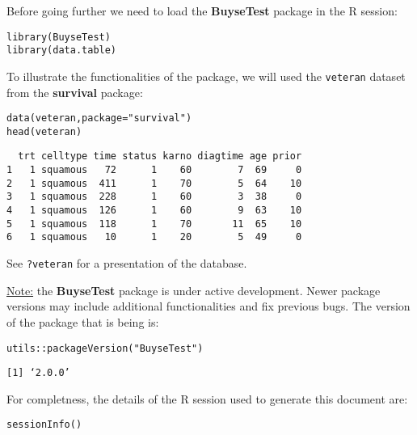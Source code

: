 \documentclass[12pt]{article}
\begin{document}
\clearpage

Before going further we need to load the \textbf{BuyseTest} package in the R
session:
\lstset{language=r,label= ,caption= ,captionpos=b,numbers=none}
\begin{lstlisting}
library(BuyseTest)
library(data.table)
\end{lstlisting}

To illustrate the functionalities of the package, we will used the
\texttt{veteran} dataset from the \textbf{survival} package:
\lstset{language=r,label= ,caption= ,captionpos=b,numbers=none}
\begin{lstlisting}
data(veteran,package="survival")
head(veteran)
\end{lstlisting}

\begin{verbatim}
  trt celltype time status karno diagtime age prior
1   1 squamous   72      1    60        7  69     0
2   1 squamous  411      1    70        5  64    10
3   1 squamous  228      1    60        3  38     0
4   1 squamous  126      1    60        9  63    10
5   1 squamous  118      1    70       11  65    10
6   1 squamous   10      1    20        5  49     0
\end{verbatim}

See \texttt{?veteran} for a presentation of the database.

\bigskip

\uline{Note:} the \textbf{BuyseTest} package is under active development. Newer
package versions may include additional functionalities and fix
previous bugs. The version of the package that is being is:
\lstset{language=r,label= ,caption= ,captionpos=b,numbers=none}
\begin{lstlisting}
utils::packageVersion("BuyseTest")
\end{lstlisting}

\begin{verbatim}
[1] ‘2.0.0’
\end{verbatim}

For completness, the details of the R session used to generate this
document are:
\lstset{language=r,label= ,caption= ,captionpos=b,numbers=none}
\begin{lstlisting}
sessionInfo()
\end{lstlisting}
\end{document}
